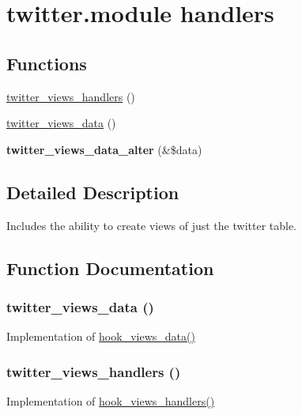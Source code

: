 \hypertarget{group__views__twitter__module}{
\section{twitter.module handlers}
\label{group__views__twitter__module}
}
\subsection*{Functions}
\begin{CompactItemize}
\item 
\hyperlink{group__views__twitter__module_ga0ef75b4d343006ac49d134b1e430dfb}{twitter\_\-views\_\-handlers} ()
\item 
\hyperlink{group__views__twitter__module_gf85337c107d23196b51d5c13e35f4804}{twitter\_\-views\_\-data} ()
\item 
\hypertarget{group__views__twitter__module_gaa2b6d0348d261b13646346bcd6a3c31}{
\textbf{twitter\_\-views\_\-data\_\-alter} (\&\$data)}
\label{group__views__twitter__module_gaa2b6d0348d261b13646346bcd6a3c31}

\end{CompactItemize}


\subsection{Detailed Description}
Includes the ability to create views of just the twitter table. 

\subsection{Function Documentation}
\hypertarget{group__views__twitter__module_gf85337c107d23196b51d5c13e35f4804}{
\subsubsection[{twitter\_\-views\_\-data}]{\setlength{\rightskip}{0pt plus 5cm}twitter\_\-views\_\-data ()}}
\label{group__views__twitter__module_gf85337c107d23196b51d5c13e35f4804}


Implementation of \hyperlink{group__views__hooks_g227057901681e4a33e33c199c7a8c989}{hook\_\-views\_\-data()} \hypertarget{group__views__twitter__module_ga0ef75b4d343006ac49d134b1e430dfb}{
\subsubsection[{twitter\_\-views\_\-handlers}]{\setlength{\rightskip}{0pt plus 5cm}twitter\_\-views\_\-handlers ()}}
\label{group__views__twitter__module_ga0ef75b4d343006ac49d134b1e430dfb}


Implementation of \hyperlink{group__views__hooks_gbf506f44bd8d8a86876f27396f5341ed}{hook\_\-views\_\-handlers()} 